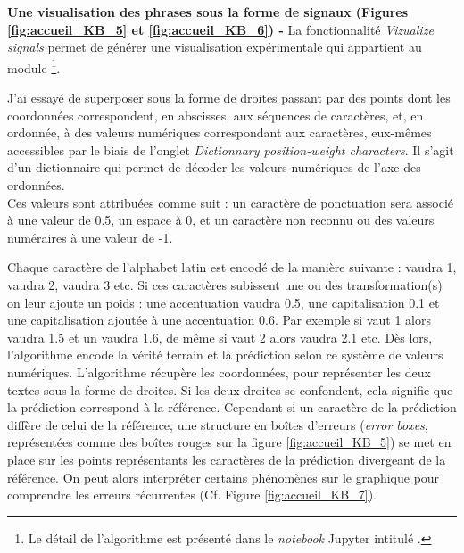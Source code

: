 \textbf{Une visualisation des phrases sous la forme de signaux (Figures \ref{fig:accueil_KB_5} et \ref{fig:accueil_KB_6}) - } La fonctionnalité \textit{Vizualize signals} permet de générer une visualisation expérimentale qui appartient au module \footnote{Le détail de l'algorithme est présenté dans le \textit{notebook} Jupyter intitulé .}. 

J'ai essayé de superposer sous la forme de droites passant par des points dont les coordonnées correspondent, en abscisses, aux séquences de caractères, et, en ordonnée, à des valeurs numériques correspondant aux caractères, eux-mêmes accessibles par le biais de l'onglet \textit{Dictionnary position-weight characters}. Il s'agit d'un dictionnaire qui permet de décoder les valeurs numériques de l'axe des ordonnées.\\ 

Ces valeurs sont attribuées comme suit : un caractère de ponctuation sera associé à une valeur de 0.5, un espace à 0, et un caractère non reconnu ou des valeurs numéraires à une valeur de -1.

Chaque caractère de l'alphabet latin est encodé de la manière suivante :  vaudra 1,  vaudra 2,  vaudra 3 etc. 
Si ces caractères subissent une ou des transformation(s) on leur ajoute un poids : une accentuation vaudra 0.5, une capitalisation 0.1 et une capitalisation ajoutée à une accentuation 0.6. Par exemple si  vaut 1 alors  vaudra 1.5 et un  vaudra 1.6, de même si  vaut 2 alors  vaudra 2.1 etc.
Dès lors, l'algorithme encode la vérité terrain et la prédiction selon ce système de valeurs numériques. L'algorithme récupère les coordonnées, pour représenter les deux textes sous la forme de droites. 
Si les deux droites se confondent, cela signifie que la prédiction correspond à la référence. Cependant si un caractère de la prédiction diffère de celui de la référence, une structure en boîtes d'erreurs (\textit{error boxes}, représentées comme des boîtes rouges sur la figure \ref{fig:accueil_KB_5}) se met en place sur les points représentants les caractères de la prédiction divergeant de la référence. On peut alors interpréter certains phénomènes sur le graphique pour comprendre les erreurs récurrentes (Cf. Figure \ref{fig:accueil_KB_7}).\\ 

